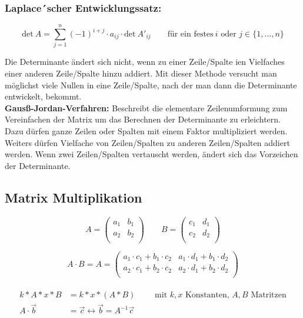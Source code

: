 \subsubsection{Laplace´scher Entwicklungssatz:}

\[
\text{det}\ A=\sum\limits_{j=1}^{n}(-1)^{i+j}\cdot a_{ij}\cdot \text{det}\ A'_{ij}\qquad \text{für ein festes}\ i\text{ oder } j \in \{1,\ldots,n \}
\]

Die Determinante ändert sich nicht, wenn zu einer Zeile/Spalte ien Vielfaches einer anderen Zeile/Spalte hinzu addiert. Mit dieser Methode versucht man möglichst viele Nullen in eine Zeile/Spalte, nach der man dann die Determinante entwickelt, bekommt.\\

\textbf{Gausß-Jordan-Verfahren:} Beschreibt die elementare Zeilenumformung zum Vereinfachen der Matrix um das Berechnen der Determinante zu erleichtern. Dazu dürfen ganze Zeilen oder Spalten mit einem Faktor multipliziert werden. Weiters dürfen Vielfache von Zeilen/Spalten zu anderen Zeilen/Spalten addiert werden. Wenn zwei Zeilen/Spalten vertauscht werden, ändert sich das Vorzeichen der Determinante.

\subsection{Matrix Multiplikation}

\[A=\begin{pmatrix}
 a_1 & b_1 \\
 a_2 & b_2 \\
\end{pmatrix} \qquad
B=\begin{pmatrix}
 c_1 & d_1 \\
 c_2 & d_2 \\
\end{pmatrix}\]

\[A\cdot B = 
A=\begin{pmatrix}
 a_1 \cdot c_1 + b_1 \cdot c_2 & a_1 \cdot d_1 + b_1 \cdot d_2 \\
 a_2 \cdot c_1 + b_2 \cdot c_2 & a_2 \cdot d_1 + b_2 \cdot d_2 \\
\end{pmatrix}\]\\

\begin{align}
    k*A*x*B &= k*x*(A*B) \qquad \text{ mit } k,x \text{ Konstanten, }A,B \text{ Matritzen}\\
    A\cdot \vec{b} &= \vec{c} \leftrightarrow \vec{b} = A^{-1}\vec{c}    
\end{align}


